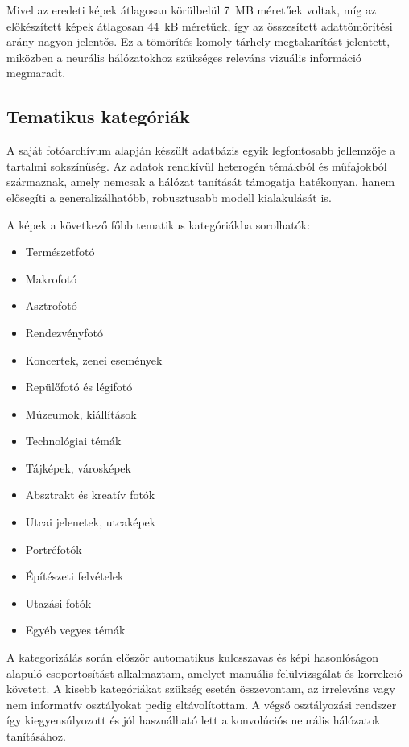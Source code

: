             Mivel az eredeti képek átlagosan körülbelül 7~MB méretűek voltak, míg az előkészített képek átlagosan 44~kB méretűek, így az összesített adattömörítési arány nagyon jelentős. Ez a tömörítés komoly tárhely-megtakarítást jelentett, miközben a neurális hálózatokhoz szükséges releváns vizuális információ megmaradt.
            
        \subsection{Tematikus kategóriák}
            
            A saját fotóarchívum alapján készült adatbázis egyik legfontosabb jellemzője a tartalmi sokszínűség. Az adatok rendkívül heterogén témákból és műfajokból származnak, amely nemcsak a hálózat tanítását támogatja hatékonyan, hanem elősegíti a generalizálhatóbb, robusztusabb modell kialakulását is.
            
            A képek a következő főbb tematikus kategóriákba sorolhatók:
            
            \begin{itemize}
                \item Természetfotó
                \item Makrofotó
                \item Asztrofotó
                \item Rendezvényfotó
                \item Koncertek, zenei események
                \item Repülőfotó és légifotó
                \item Múzeumok, kiállítások
                \item Technológiai témák
                \item Tájképek, városképek
                \item Absztrakt és kreatív fotók
                \item Utcai jelenetek, utcaképek
                \item Portréfotók
                \item Építészeti felvételek
                \item Utazási fotók
                \item Egyéb vegyes témák
            \end{itemize}
            
            A kategorizálás során először automatikus kulcsszavas és képi hasonlóságon alapuló csoportosítást alkalmaztam, amelyet manuális felülvizsgálat és korrekció követett. A kisebb kategóriákat szükség esetén összevontam, az irreleváns vagy nem informatív osztályokat pedig eltávolítottam. A végső osztályozási rendszer így kiegyensúlyozott és jól használható lett a konvolúciós neurális hálózatok tanításához.
            
